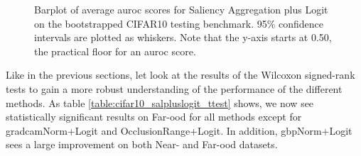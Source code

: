 \documentclass[UKenglish]{uiomasterthesis} %
\theoremstyle{definition}
\begin{document}
\begin{figure}[hbtp]
    \begin{center}
        
    \end{center}
    \caption[CIFAR10 Saliency Aggregation plus Logit Bootstrap]{Barplot of average \ac{auroc} scores for Saliency Aggregation plus Logit on the bootstrapped CIFAR10 testing benchmark. 95\% confidence intervals are plotted as whiskers. Note that the y-axis starts at 0.50, the practical floor for an \ac{auroc} score.}
    \label{fig:cifar10_salpluslogit_bootstrap_barplot}
\end{figure}

Like in the previous sections, let look at the results of the Wilcoxon signed-rank tests to gain a more robust understanding of the performance of the different methods. As table \ref{table:cifar10_salpluslogit_ttest} shows, we now see statistically significant results on Far-\ac{ood} for all methods except for \ac{gradcam}Norm+Logit and OcclusionRange+Logit. In addition, \ac{gbp}Norm+Logit sees a large improvement on both Near- and Far-\ac{ood} datasets. 
\end{document}
